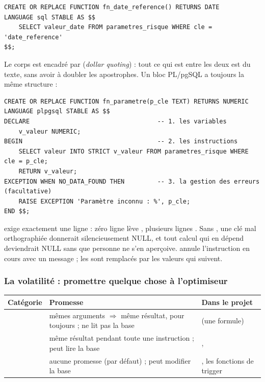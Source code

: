 \begin{lstlisting}[style=sql]
CREATE OR REPLACE FUNCTION fn_date_reference() RETURNS DATE
LANGUAGE sql STABLE AS $$
    SELECT valeur_date FROM parametres_risque WHERE cle = 'date_reference'
$$;
\end{lstlisting}

Le corps est encadré par  (\emph{dollar quoting}) : tout ce qui est entre les deux est
du texte, sans avoir à doubler les apostrophes. Un bloc PL/pgSQL a toujours la même structure :

\begin{lstlisting}[style=sql]
CREATE OR REPLACE FUNCTION fn_parametre(p_cle TEXT) RETURNS NUMERIC
LANGUAGE plpgsql STABLE AS $$
DECLARE                                   -- 1. les variables
    v_valeur NUMERIC;
BEGIN                                     -- 2. les instructions
    SELECT valeur INTO STRICT v_valeur FROM parametres_risque WHERE cle = p_cle;
    RETURN v_valeur;
EXCEPTION WHEN NO_DATA_FOUND THEN         -- 3. la gestion des erreurs (facultative)
    RAISE EXCEPTION 'Paramètre inconnu : %', p_cle;
END $$;
\end{lstlisting}

 exige exactement une ligne : zéro ligne lève , plusieurs lignes
. Sans , une clé mal orthographiée donnerait silencieusement NULL, et
tout calcul qui en dépend deviendrait NULL sans que personne ne s'en aperçoive. 
annule l'instruction en cours avec un message ; les \code{\%} sont remplacés par les valeurs qui
suivent.

\subsubsection{La volatilité : promettre quelque chose à l'optimiseur}

\begin{center}\small
\begin{tabularx}{\linewidth}{@{}P{2.4cm} L P{4.8cm}@{}}
\toprule
\textbf{Catégorie} & \textbf{Promesse} & \textbf{Dans le projet} \\
\midrule
{} & mêmes arguments $\Rightarrow$ même résultat, pour toujours ; ne lit pas la base &
 (une formule) \\
 & même résultat pendant toute une instruction ; peut lire la base & ,
 \\
 & aucune promesse (par défaut) ; peut modifier la base & , les fonctions
de trigger \\
\bottomrule
\end{tabularx}
\end{center}

